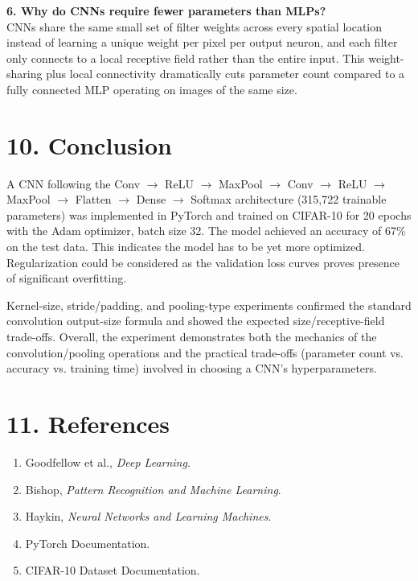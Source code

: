 \documentclass[11pt]{article}
\begin{document}
\textbf{6. Why do CNNs require fewer parameters than MLPs?}\\
CNNs share the same small set of filter weights across every spatial location instead of learning a unique weight per pixel per output neuron, and each filter only connects to a local receptive field rather than the entire input. This weight-sharing plus local connectivity dramatically cuts parameter count compared to a fully connected MLP operating on images of the same size.

\section*{10. Conclusion}
A CNN following the Conv $\rightarrow$ ReLU $\rightarrow$ MaxPool $\rightarrow$ Conv $\rightarrow$ ReLU $\rightarrow$ MaxPool $\rightarrow$ Flatten $\rightarrow$ Dense $\rightarrow$ Softmax architecture (315,722 trainable parameters) was implemented in PyTorch and trained on CIFAR-10 for 20 epochs with the Adam optimizer, batch size 32.
\newline\newline
The model achieved an accuracy of 67\% on the test data. This indicates the model has to be yet more optimized. Regularization could be considered as the validation loss curves proves presence of significant overfitting.

Kernel-size, stride/padding, and pooling-type experiments confirmed the standard convolution output-size formula and showed the expected size/receptive-field trade-offs. Overall, the experiment demonstrates both the mechanics of the convolution/pooling operations and the practical trade-offs (parameter count vs. accuracy vs. training time) involved in choosing a CNN's hyperparameters.

\section*{11. References}
\begin{enumerate}
\item Goodfellow et al., \emph{Deep Learning}.
\item Bishop, \emph{Pattern Recognition and Machine Learning}.
\item Haykin, \emph{Neural Networks and Learning Machines}.
\item PyTorch Documentation.
\item CIFAR-10 Dataset Documentation.
\end{enumerate}
\end{document}
